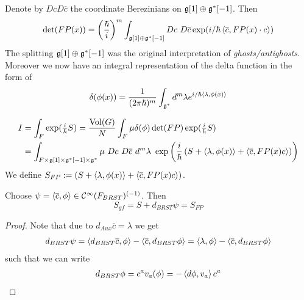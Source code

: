 \begin{lem}
  Denote by $Dc D\overline{c}$ the coordinate Berezinians on $\mathfrak{g}[1] \oplus \mathfrak{g}^*[-1]$. Then
  \begin{equation}
    \det(FP(x)) = \left(\frac{\hbar}{i}\right)^m \int_{\gf[1] \oplus \gf^*[-1]} Dc \ D\overline{c} \exp(i/\hbar \pair{\overline{c}}{FP(x) \cdot c})
  \end{equation}
  The splitting $\mathfrak{g}[1] \oplus \mathfrak{g}^*[-1]$ was the original interpretation of \emph{ghosts/antighosts}. Moreover we now have an integral representation of the delta function in the form of
  \begin{equation}
    \delta(\phi(x)) = \frac{1}{(2\pi\hbar)^m} \int_{\gf^*} d^m \lambda e^{i/\hbar \pair{\lambda}{\phi(x)}}
  \end{equation}
\end{lem}

\begin{theo}
\label{theorem:FP}
  \begin{align}
    I &= \int_F \exp(\tfrac{i}{\hbar} S) = \frac{\vol(G)}{N} \int_F \mu \delta(\phi) \det(FP) \exp(\tfrac{i}{\hbar} S) \\
    &= \int_{F \times \gf[1] \times \gf^*[-1] \times \gf^*} \mu \ Dc \ D\overline{c} \ d^m \lambda \ \exp\left( \frac{i}{\hbar} \left( S + \pair{\lambda}{\phi(x)} + \pair{\overline{c}}{FP(x) c} \right)\right)
  \end{align}
  We define $S_{FP} := \left( S + \pair{\lambda}{\phi(x)} + \pair{\overline{c}}{FP(x) c} \right)$.
\end{theo}

\begin{theo}
\label{theorem:FP_BRST}
  Choose $\psi = \pair{\overline{c}}{\phi} \in \Ci(F_{BRST})^{(-1)}$. Then
  \begin{equation}
    S_{gf} = S + d_{BRST} \psi = S_{FP}
  \end{equation}
\begin{proof}
  Note that due to $d_{Aux} \overline{c} = \lambda$ we get
  \begin{align}
    d_{BRST} \psi = \pair{d_{BRST} \overline{c}}{\phi} - \pair{\overline{c}}{d_{BRST} \phi} = \pair{\lambda}{\phi} - \pair{\overline{c}}{d_{BRST} \phi}
  \end{align}
  such that we can write
  \begin{align}
    d_{BRST} \phi = c^a v_a (\phi) = - \pair{d\phi}{v_a} c^a
  \end{align}
\end{proof}
\end{theo}

